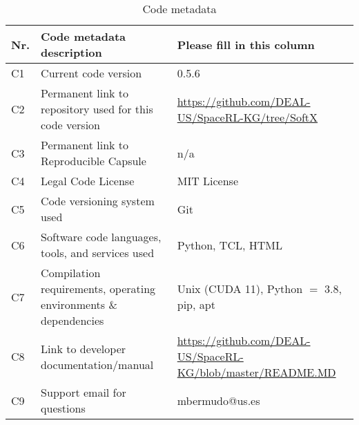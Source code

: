 \begin{table}[!h]
    \begin{tabular}{|l|p{6cm}|p{6cm}|}
    \hline
    \textbf{Nr.} & \textbf{Code metadata description} & \textbf{Please fill in this column} \\
    \hline
    C1 & Current code version & 0.5.6 \\
    \hline
    C2 & Permanent link to repository used for this code version & \url{https://github.com/DEAL-US/SpaceRL-KG/tree/SoftX} \\
    \hline
    C3  & Permanent link to Reproducible Capsule & n/a \\
    \hline
    C4 & Legal Code License & MIT License \\
    \hline
    C5 & Code versioning system used & Git \\
    \hline
    C6 & Software code languages, tools, and services used & Python, TCL, HTML \\
    \hline
    C7 & Compilation requirements, operating environments \& dependencies & Unix (CUDA 11), Python $=$ 3.8, pip, apt \\
    \hline
    C8 & Link to developer documentation/manual & \url{https://github.com/DEAL-US/SpaceRL-KG/blob/master/README.MD} \\
    \hline
    C9 & Support email for questions & mbermudo@us.es \\
    \hline
    \end{tabular}
\caption{Code metadata}
\end{table}